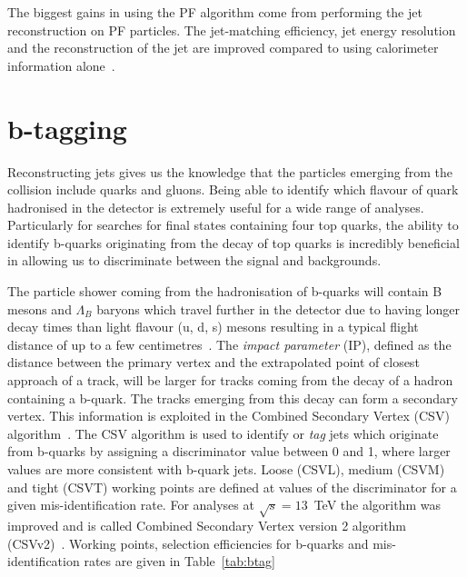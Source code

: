 The biggest gains in using the PF algorithm come from performing the jet reconstruction on PF particles. The jet-matching efficiency, jet energy resolution and the reconstruction of the jet \pt are improved compared to using calorimeter information alone~\cite{CMS-PAS-PFT-10-001}. 

\section{b-tagging ~\label{sec:btagreco}}
Reconstructing jets gives us the knowledge that the particles emerging from the collision include quarks and gluons. Being able to identify which flavour of quark hadronised in the detector is extremely useful for a wide range of analyses. Particularly for searches for final states containing four top quarks, the ability to identify b-quarks originating from the decay of top quarks is incredibly beneficial in allowing us to discriminate between the signal and backgrounds. 

The particle shower coming from the hadronisation of b-quarks will contain B mesons and $\Lambda_{B}$ baryons which travel further in the detector due to having longer decay times than light flavour (u, d, s) mesons resulting in a typical flight distance of up to a few centimetres~\cite{Collaboration2015BS0}. The \emph{impact parameter} (IP), defined as the distance between the primary vertex and the extrapolated point of closest approach of a track, will be larger for tracks coming from the decay of a hadron containing a b-quark. The tracks emerging from this decay can form a secondary vertex. This information is exploited in the Combined Secondary Vertex (CSV) algorithm~\cite{Chatrchyan:2012jua}. The CSV algorithm is used to identify or \emph{tag} jets which originate from b-quarks by assigning a discriminator value between 0 and 1, where larger values are more consistent with b-quark jets. Loose (CSVL), medium (CSVM) and tight (CSVT) working points are defined at values of the discriminator for a given mis-identification rate. For analyses at $\sqrt{s} = 13$~TeV the algorithm was improved and is called Combined Secondary Vertex version 2 algorithm (CSVv2)~\cite{CMS-PAS-BTV-15-001}. Working points, selection efficiencies for b-quarks and mis-identification rates are given in Table~\ref{tab:btag} 

